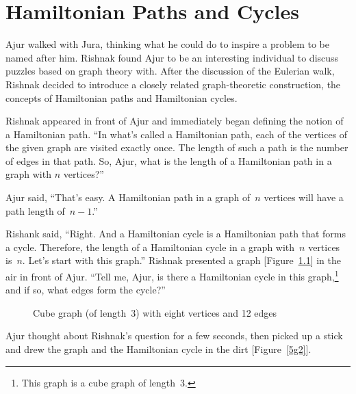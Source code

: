 \chapter{Hamiltonian Paths and Cycles}

Ajur walked with Jura, thinking what he could do to inspire a problem to be named after him. Rishnak found Ajur to be an interesting individual to discuss puzzles based on graph theory with. After the discussion of the Eulerian walk, Rishnak decided to introduce a closely related graph-theoretic construction, the concepts of Hamiltonian paths and Hamiltonian cycles.

Rishnak appeared in front of Ajur and immediately began defining the notion of a Hamiltonian path. ``In what's called a Hamiltonian path, each of the vertices of the given graph are visited exactly once. The length of such a path is the number of edges in that path. So, Ajur, what is the length of a Hamiltonian path in a graph with $n$ vertices?''

Ajur said, ``That's easy. A Hamiltonian path in a graph of~$n$ vertices will have a path length of~$n-1$.''

Rishank said, ``Right. And a Hamiltonian cycle is a Hamiltonian path that forms a cycle. Therefore, the length of a Hamiltonian cycle in a graph with~$n$ vertices is~$n$. Let's start with this graph.'' Rishnak presented a graph [Figure~\ref{5g1}] in the air in front of Ajur. ``Tell me, Ajur, is there a Hamiltonian cycle in this graph,\footnote{This graph is a cube graph of length~3.} and if so, what edges form the cycle?''

\begin{figure}
\begin{center}
\caption{Cube graph (of length~3) with eight vertices and 12 edges}\label{5g1}
\end{center}
\end{figure}

Ajur thought about Rishnak's question for a few seconds, then picked up a stick and drew the graph and the Hamiltonian cycle in the dirt [Figure~\ref{5g2}].

